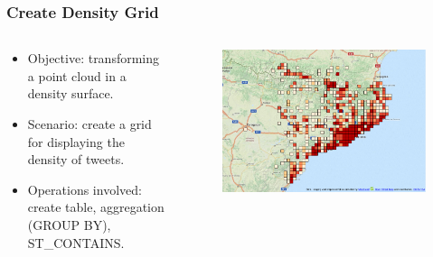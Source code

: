 \documentclass[hyperref={pdfpagelabels=true}]{beamer}
\begin{document}
\begin{frame}
\frametitle{Create Density Grid}
\begin{columns}
  \begin{column}{0.5\textwidth}
  \begin{itemize}    
    \item<1->Objective: transforming a point cloud in a density surface.
    \item<1->Scenario: create a grid for displaying the density of tweets.%
    \item<1->Operations involved: create table, aggregation (GROUP BY), ST\_CONTAINS.    
  \end{itemize} 
 \end{column}  
  \begin{column}{0.5\textwidth}  
    \begin{figure}       
	\includegraphics[width=\textwidth]{density.png}      
     \end{figure}            
 \end{column}  
\end{columns}      
\end{frame}
\end{document}
